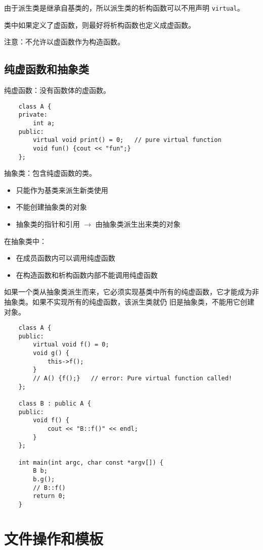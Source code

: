 \documentclass[UTF8]{ctexart}
\begin{document}
由于派生类是继承自基类的，所以派生类的析构函数可以不用声明 \texttt{virtual}。

类中如果定义了虚函数，则最好将析构函数也定义成虚函数。

注意：不允许以虚函数作为构造函数。

\subsection{纯虚函数和抽象类}
纯虚函数：没有函数体的虚函数。
\begin{verbatim}
    class A {
    private:
        int a;
    public:
        virtual void print() = 0;   // pure virtual function
        void fun() {cout << "fun";}
    };
\end{verbatim}

抽象类：包含纯虚函数的类。
\begin{itemize}
    \item 只能作为基类来派生新类使用
    \item 不能创建抽象类的对象
    \item 抽象类的指针和引用 $\rightarrow$ 由抽象类派生出来类的对象
\end{itemize}

在抽象类中：
\begin{itemize}
    \item 在成员函数内可以调用纯虚函数
    \item 在构造函数和析构函数内部不能调用纯虚函数
\end{itemize}

如果一个类从抽象类派生而来，它必须实现基类中所有的纯虚函数，它才能成为非抽象类。如果不实现所有的纯虚函数，该派生类就仍
旧是抽象类，不能用它创建对象。

\begin{verbatim}
    class A {
    public:
        virtual void f() = 0;
        void g() {
            this->f();
        }
        // A() {f();}   // error: Pure virtual function called!
    };

    class B : public A {
    public:
        void f() {
            cout << "B::f()" << endl;
        }
    };

    int main(int argc, char const *argv[]) {
        B b;
        b.g();
        // B::f()
        return 0;
    }
\end{verbatim}

\section{文件操作和模板}
\end{document}
